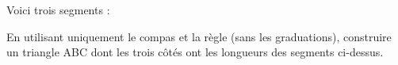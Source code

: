 \documentclass[exercice]{thedocument}%
\begin{document}
%
Voici trois segments :\vskip10pt
\vskip30pt
En utilisant uniquement le compas et la règle (sans les graduations),
construire un triangle ABC dont les trois côtés ont les longueurs des
segments ci-dessus.
\end{document}
